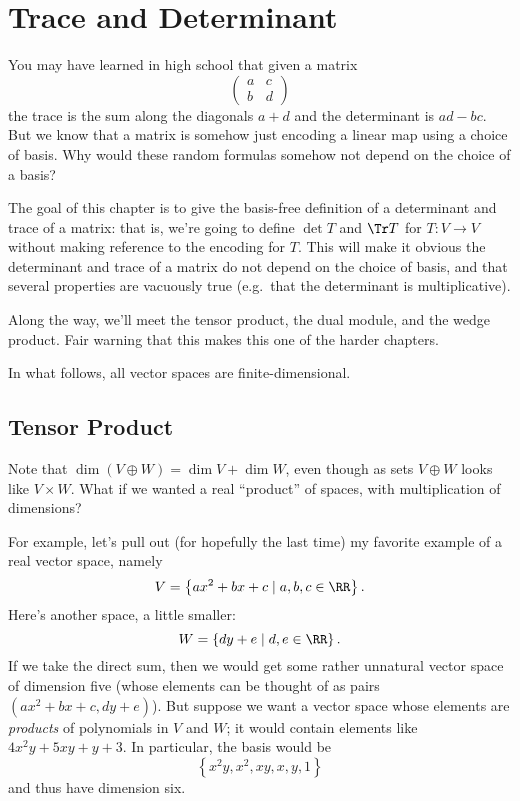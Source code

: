 \chapter{Trace and Determinant}
You may have learned in high school that given a matrix
\[ \left(
	\begin{array}{cc}
		a & c \\
		b & d
	\end{array}
	\right)
\]
the trace is the sum along the diagonals $a+d$ and the determinant is $ad-bc$.
But we know that a matrix is somehow just encoding a linear map using a choice of basis.
Why would these random formulas somehow not depend on the choice of a basis?

The goal of this chapter is to give the basis-free definition of a determinant and trace of a matrix:
that is, we're going to define $\det T$ and $\Tr T$ for $T : V \to V$ without making reference to the encoding for $T$.
This will make it obvious the determinant and trace of a matrix do not depend on the choice of basis,
and that several properties are vacuously true (e.g.\ that the determinant is multiplicative).

Along the way, we'll meet the tensor product, the dual module, and the wedge product.
Fair warning that this makes this one of the harder chapters.

In what follows, all vector spaces are finite-dimensional.

\section{Tensor Product}
Note that $\dim (V \oplus W) = \dim V + \dim W$, even though as sets $V \oplus W$ looks like $V \times W$.
What if we wanted a real ``product'' of spaces,
with multiplication of dimensions?

For example, let's pull out (for hopefully the last time)
my favorite example of a real vector space, namely
\[ V = \left\{ ax^2 + bx + c \mid a,b,c \in \RR \right\}. \]
Here's another space, a little smaller:
\[ W = \left\{ dy + e \mid d,e \in \RR \right\}. \]
If we take the direct sum, then we would get some rather unnatural
vector space of dimension five
(whose elements can be thought of as pairs $(ax^2+bx+c,dy+e)$).
But suppose we want a vector space
whose elements are \emph{products} of polynomials in $V$ and $W$;
it would contain elements like $4x^2y + 5xy + y + 3$.
In particular, the basis would be
\[ \left\{ x^2y, x^2, xy, x, y, 1 \right\} \]
and thus have dimension six.

